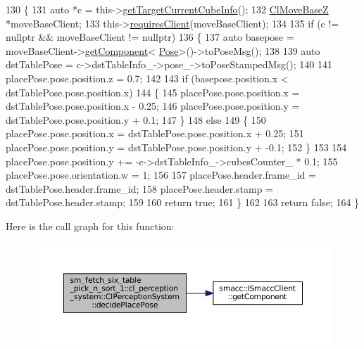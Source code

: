 \begin{DoxyCode}
130             \{
131                 \textcolor{keyword}{auto} *c = this->\hyperlink{classsm__fetch__six__table__pick__n__sort__1_1_1cl__perception__system_1_1ClPerceptionSystem_a4103ba8479b122c7af34b3b51102c5d5}{getTargetCurrentCubeInfo}();
132                 \hyperlink{classcl__move__base__z_1_1ClMoveBaseZ}{ClMoveBaseZ} *moveBaseClient;
133                 this->\hyperlink{classsmacc_1_1ISmaccClient_a7a9990a2f3e35d547671188d69fee520}{requiresClient}(moveBaseClient);
134 
135                 \textcolor{keywordflow}{if} (c != \textcolor{keyword}{nullptr} && moveBaseClient != \textcolor{keyword}{nullptr})
136                 \{
137                     \textcolor{keyword}{auto} basepose = moveBaseClient->\hyperlink{classsmacc_1_1ISmaccClient_adef78db601749ca63c19e74a27cb88cc}{getComponent}<
      \hyperlink{classcl__move__base__z_1_1Pose}{Pose}>()->toPoseMsg();
138 
139                     \textcolor{keyword}{auto} dstTablePose = c->dstTableInfo\_->pose\_->toPoseStampedMsg();
140 
141                     placePose.pose.position.z = 0.7;
142 
143                     \textcolor{keywordflow}{if} (basepose.position.x < dstTablePose.pose.position.x)
144                     \{
145                         placePose.pose.position.x = dstTablePose.pose.position.x - 0.25;
146                         placePose.pose.position.y = dstTablePose.pose.position.y + 0.1;
147                     \}
148                     \textcolor{keywordflow}{else}
149                     \{
150                         placePose.pose.position.x = dstTablePose.pose.position.x + 0.25;
151                         placePose.pose.position.y = dstTablePose.pose.position.y + -0.1;
152                     \}
153 
154                     placePose.pose.position.y += -c->dstTableInfo\_->cubesCounter\_ * 0.1;
155                     placePose.pose.orientation.w = 1;
156 
157                     placePose.header.frame\_id = dstTablePose.header.frame\_id;
158                     placePose.header.stamp = dstTablePose.header.stamp;
159 
160                     \textcolor{keywordflow}{return} \textcolor{keyword}{true};
161                 \}
162 
163                 \textcolor{keywordflow}{return} \textcolor{keyword}{false};
164             \}
\end{DoxyCode}
Here is the call graph for this function\+:
\nopagebreak
\begin{figure}[H]
\begin{center}
\leavevmode
\includegraphics[width=350pt]{classsm__fetch__six__table__pick__n__sort__1_1_1cl__perception__system_1_1ClPerceptionSystem_a553101516ba25a6a9f293e33b4e90dad_cgraph}
\end{center}
\end{figure}
